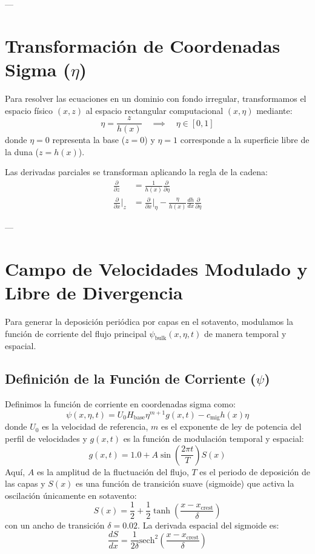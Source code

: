 \documentclass[11pt,a4paper]{article}
\begin{document}
---

\section{Transformación de Coordenadas Sigma (\(\eta\))}
Para resolver las ecuaciones en un dominio con fondo irregular, transformamos el espacio físico $(x, z)$ al espacio rectangular computacional $(x, \eta)$ mediante:
\begin{equation}
\eta = \frac{z}{h(x)} \quad \implies \quad \eta \in [0, 1]
\end{equation}
donde $\eta = 0$ representa la base ($z=0$) y \(\eta = 1\) corresponde a la superficie libre de la duna ($z=h(x)$).

Las derivadas parciales se transforman aplicando la regla de la cadena:
\begin{align}
\frac{\partial}{\partial z} &= \frac{1}{h(x)} \frac{\partial}{\partial \eta} \\
\frac{\partial}{\partial x}\Big|_z &= \frac{\partial}{\partial x}\Big|_{\eta} - \frac{\eta}{h(x)} \frac{dh}{dx} \frac{\partial}{\partial \eta}
\end{align}

---

\section{Campo de Velocidades Modulado y Libre de Divergencia}
Para generar la deposición periódica por capas en el sotavento, modulamos la función de corriente del flujo principal $\psi_{\text{bulk}}(x, \eta, t)$ de manera temporal y espacial.

\subsection{Definición de la Función de Corriente (\(\psi\))}
Definimos la función de corriente en coordenadas sigma como:
\begin{equation}
\psi(x, \eta, t) = U_0 H_{\text{base}} \eta^{m+1} g(x, t) - c_{\text{mig}} h(x) \eta
\end{equation}
donde $U_0$ es la velocidad de referencia, $m$ es el exponente de ley de potencia del perfil de velocidades y $g(x, t)$ es la función de modulación temporal y espacial:
\begin{equation}
g(x, t) = 1.0 + A \sin\left(\frac{2\pi t}{T}\right) S(x)
\end{equation}
Aquí, $A$ es la amplitud de la fluctuación del flujo, $T$ es el periodo de deposición de las capas y $S(x)$ es una función de transición suave (sigmoide) que activa la oscilación únicamente en sotavento:
\begin{equation}
S(x) = \frac{1}{2} + \frac{1}{2}\tanh\left(\frac{x - x_{\text{crest}}}{\delta}\right)
\end{equation}
con un ancho de transición $\delta = 0.02$. La derivada espacial del sigmoide es:
\begin{equation}
\frac{dS}{dx} = \frac{1}{2\delta} \text{sech}^2\left(\frac{x - x_{\text{crest}}}{\delta}\right)
\end{equation}
\end{document}
